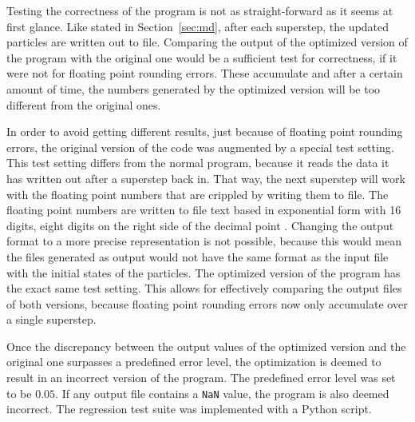 \documentclass[twoside,11pt]{article}
\begin{document}
Testing the correctness of the program is not as straight-forward as
it seems at first glance.
Like stated in Section~\ref{sec:md}, after each superstep, the
updated particles are written out to file.
Comparing the output of the optimized version of the program with the
original one would be a sufficient test for correctness, if it were
not for floating point rounding errors.
These accumulate and after a certain amount of time, the numbers
generated by the optimized version will be too different from the
original ones.

In order to avoid getting different results, just because of floating
point rounding errors, the original version of the code was augmented
by a special test setting.
This test setting differs from the normal program, because it reads
the data it has written out after a superstep back in.
That way, the next superstep will work with the floating point numbers
that are crippled by writing them to file.
The floating point numbers are written to file text based in
exponential form with 16 digits, eight digits on the right side of the
decimal point \citep[see e.g.][for formatting io in Fortran]
{fortran_formats}.
Changing the output format to a more precise representation is not
possible, because this would mean the files generated as output would
not have the same format as the input file with the initial states of
the particles.
The optimized version of the program has the exact same test setting.
This allows for effectively comparing the output files of both
versions, because floating point rounding errors now only accumulate
over a single superstep.

Once the discrepancy between the output values of the optimized
version and the original one surpasses a predefined error level,
the optimization is deemed to result in an incorrect version of the
program.
The predefined error level was set to be $0.05$.
If any output file contains a \texttt{NaN} value, the program is
also deemed incorrect.
The regression test suite was implemented with a Python script.
\end{document}
